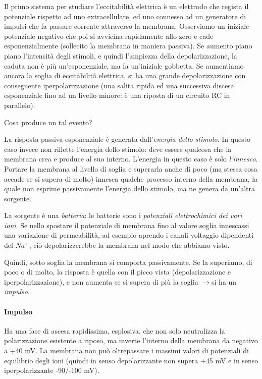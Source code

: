 \documentclass[a4paper,12pt]{article}
\newcommand{\lfreccia}{\ensuremath{\longrightarrow}}
\begin{document}
Il primo sistema per studiare l'eccitabilità elettrica è un elettrodo che regista il potenziale rispetto ad uno extracellulare, ed uno connesso ad un generatore di impulsi che fa passare corrente attraverso la membrana. Osserviamo un iniziale potenziale negativo che poi si avvicina rapidamente allo zero e cade esponenzialmente (sollecito la membrana in maniera passiva). Se aumento piano piano l'intensità degli stimoli, e quindi l'ampiezza della depolarizzazione, la caduta non è più un'esponenziale, ma fa un'iniziale gobbetta. Se aumentiamo ancora la soglia di eccitabilità elettrica, si ha una grande depolarizzazione con conseguente iperpolarizzazione (una salita ripida ed una successiva discesa esponenziale fino ad un livello minore: è una riposta di un circuito RC in parallelo). 

Cosa produce un tal evento?

La risposta passiva esponenziale è generata dall'\emph{energia dello stimolo}. In questo caso invece non riflette l'energia dello stimolo: deve essere qualcosa che la membrana crea e produce al suo interno. L'energia in questo caso è solo \emph{l'innesco}. Portare la membrana al livello di soglia e superarla anche di poco (ma stessa cosa accade se si supera di molto) innesca qualche processo interno della membrana, la quale non esprime passivamente l'energia dello stimolo, ma ne genera da un'altra sorgente.

La sorgente è una \emph{batteria}: le batterie sono i \emph{potenziali elettrochimici dei vari ioni}. Se nello spostare il potenziale di membrana fino al valore soglia innescassi una variazione di permeabilità, ad esempio aprendo i canali voltaggio dipendenti del $Na^{+}$, ciò depolarizzerebbe la membrana nel modo che abbiamo visto.

Quindi, sotto soglia la membrana si comporta passivamente. Se la superiamo, di poco o di molto, la risposta è quella con il picco vista (depolarizzazione e iperpolarizzazione), e non aumenta se si supera di più la soglia \lfreccia si ha un \emph{impulso}.

\paragraph{Impulso}
Ha una fase di ascesa rapidissima, esplosiva, che non solo neutralizza la polarizzazione esistente a riposo, ma inverte l'interno della membrana da negativo a +40 mV. La membrana non può oltrepassare i massimi valori di potenziali di equilibrio degli ioni (quindi in senso depolarizzante non supera +45 mV e in senso iperpolarizzante -90/-100 mV).
\end{document}
